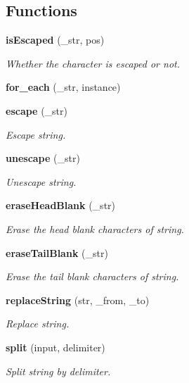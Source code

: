 \subsection*{Functions}
\begin{CompactItemize}
\item 
{\bf is\-Escaped} (\_\-str, pos)
\begin{CompactList}\small\item\em Whether the character is escaped or not. \item\end{CompactList}\item 
{\bf for\_\-each} (\_\-str, instance)
\item 
{\bf escape} (\_\-str)
\begin{CompactList}\small\item\em Escape string. \item\end{CompactList}\item 
{\bf unescape} (\_\-str)
\begin{CompactList}\small\item\em Unescape string. \item\end{CompactList}\item 
{\bf erase\-Head\-Blank} (\_\-str)
\begin{CompactList}\small\item\em Erase the head blank characters of string. \item\end{CompactList}\item 
{\bf erase\-Tail\-Blank} (\_\-str)
\begin{CompactList}\small\item\em Erase the tail blank characters of string. \item\end{CompactList}\item 
{\bf replace\-String} (str, \_\-from, \_\-to)
\begin{CompactList}\small\item\em Replace string. \item\end{CompactList}\item 
{\bf split} (input, delimiter)
\begin{CompactList}\small\item\em Split string by delimiter. \item\end{CompactList}\item 

\end{CompactItemize}
